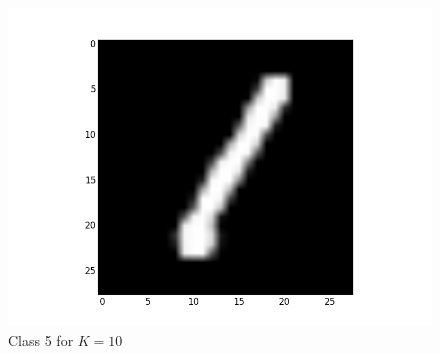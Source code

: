 \documentclass[submit]{harvardml}
\begin{document}
\begin{figure}[ht]
    \includegraphics[scale=0.20]{representative-4-2}
    \caption{Class 5 for $K=10$}
\end{figure}
\end{document}
